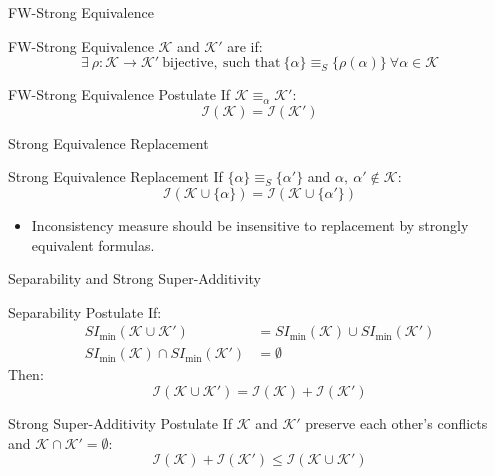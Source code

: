 \begin{frame}{FW-Strong Equivalence}
    \begin{block}{FW-Strong Equivalence}
        \(\mathcal{K}\) and \(\mathcal{K}'\) are  if:
        \[
            \exists\ \rho : \mathcal{K} \rightarrow \mathcal{K}'\ \text{bijective},\ \text{such that}\ \{\alpha\} \equiv_S \{\rho(\alpha)\}\ \forall \alpha \in \mathcal{K}
        \]
    \end{block}
    \begin{block}{FW-Strong Equivalence Postulate}
        If \(\mathcal{K} \equiv_{\alpha} \mathcal{K}'\):
        \[
            \mathcal{I}(\mathcal{K}) = \mathcal{I}(\mathcal{K}')
        \]
    \end{block}
\end{frame}

\begin{frame}{Strong Equivalence Replacement}
    \begin{block}{Strong Equivalence Replacement}
        If \(\{\alpha\} \equiv_S \{\alpha'\}\) and \(\alpha,\ \alpha' \notin \mathcal{K}\):
        \[
            \mathcal{I}(\mathcal{K} \cup \{\alpha\}) = \mathcal{I}(\mathcal{K} \cup \{\alpha'\})
        \]
    \end{block}
    \begin{itemize}
        \item Inconsistency measure should be insensitive to replacement by strongly equivalent formulas.
    \end{itemize}
\end{frame}

\begin{frame}{Separability and Strong Super-Additivity}
    \begin{block}{Separability Postulate}
        If:
        \begin{align*}
            SI_{\min}(\mathcal{K} \cup \mathcal{K}')            & = SI_{\min}(\mathcal{K}) \cup SI_{\min}(\mathcal{K}') \\
            SI_{\min}(\mathcal{K}) \cap SI_{\min}(\mathcal{K}') & = \emptyset
        \end{align*}
        Then:
        \[
            \mathcal{I}(\mathcal{K} \cup \mathcal{K}') = \mathcal{I}(\mathcal{K}) + \mathcal{I}(\mathcal{K}')
        \]
    \end{block}
    \begin{block}{Strong Super-Additivity Postulate}
        If \( \mathcal{K} \) and \( \mathcal{K}' \) preserve each other's conflicts and \( \mathcal{K} \cap \mathcal{K}' = \emptyset \):
        \[
            \mathcal{I}(\mathcal{K}) + \mathcal{I}(\mathcal{K}') \leq \mathcal{I}(\mathcal{K} \cup \mathcal{K}')
        \]
    \end{block}
\end{frame}

